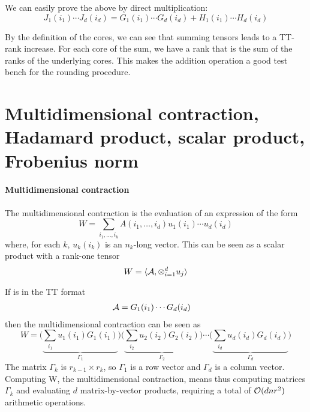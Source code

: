 We can easily prove the above by direct multiplication:
\begin{equation*}
  J_1(i_1) \cdots J_d(i_d) = G_1(i_1) \cdots G_d(i_d) + H_1(i_1) \cdots H_d(i_d)
\end{equation*}

By the definition of the cores, we can see that summing tensors leads to a TT-rank increase. For each core of the sum, we have a rank that is the sum of the ranks of the underlying cores. This makes the addition operation a good test bench for the rounding procedure.

\section[Contraction, products and norm]{Multidimensional contraction, Hadamard product, scalar product, Frobenius norm}
\paragraph{Multidimensional contraction}
The multidimensional contraction is the evaluation of an expression of the form
\begin{equation*}
  W = \sum_{i_1,\ldots,i_k} A(i_1,\ldots,i_d) u_1(i_1) \cdots u_d(i_d)
\end{equation*}
where, for each $k$, $u_k(i_k)$ is an $n_k$-long vector. This can be seen as a scalar product with a rank-one tensor
\begin{equation*}
  W = \langle \mathcal{A}, \otimes_{i=1}^d u_j \rangle
\end{equation*}

If \A is in the TT format
\begin{equation*}
  \begin{split}
    \mathcal{A} &= G_1(i_1) \cdots G_d(i_d)
  \end{split}
\end{equation*}
then the multidimensional contraction can be seen as
\begin{equation*}
  W = \Bigg( \underbrace{\sum_{i_1} u_1(i_1)G_1(i_1)}_{\Gamma_1} \Bigg) \Bigg( \underbrace{ \sum_{i_2} u_2(i_2)G_2(i_2)}_{\Gamma_2} \Bigg) \cdots \Bigg( \underbrace{\sum_{i_d} u_d(i_d)G_d(i_d)}_{\Gamma_d} \Bigg)
\end{equation*}
The matrix $\Gamma_k$ is $r_{k-1} \times r_k$, so $\Gamma_1$ is a row vector and $\Gamma_d$ is a column vector. Computing W, the multidimensional contraction, means thus computing matrices $\Gamma_k$ and evaluating $d$ matrix-by-vector products, requiring a total of $\mathcal{O}(dnr^2)$ arithmetic operations.

